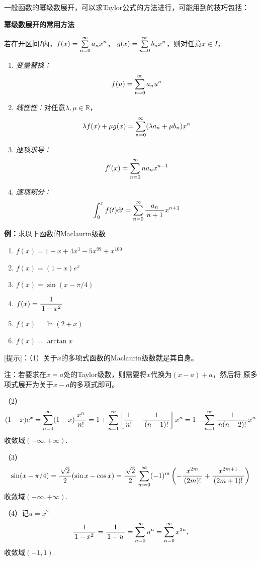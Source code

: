 一般函数的幂级数展开，可以求Taylor公式的方法进行，可能用到的技巧包括：

\begin{thx}
	{\bf 幂级数展开的常用方法}
	
	若在开区间$I$内，$f(x)=\sumn[0]a_nx^n$，
	$g(x)=\sumn[0]b_nx^n$，则对任意$x\in I$，
	\begin{enumerate}[(1)]
	  \item {\it 变量替换：}
	  $$f(u)=\sumn[0]a_nu^n$$
	  \item {\it 线性性：}对任意$\lambda,\mu\in\mathbb{R}$，
	  $$\lambda f(x)+\mu g(x)=\sumn[0](\lambda a_n+\mu
	  b_n)x^n$$ 
	  \item {\it 逐项求导：}
	  $$f'(x)=\sumn[0]na_{n}x^{n-1}$$ 
	  \item {\it 逐项积分：} 
	  $$\dint_0^x f(t)\d t=\sum\limits_{n=0}^{\infty}
	  \df{a_{n}}{n+1}x^{n+1}$$
	\end{enumerate}
\end{thx}

{\bf 例：}求以下函数的Maclaurin级数

\begin{enumerate}[(1)]
  \setlength{\itemindent}{1cm}
  \item $f(x)=1+x+4x^3-5x^{99}+x^{100}$
  \item $f(x)=(1-x)e^x$
  \item $f(x)=\sin(x-\pi/4)$
  \item $f(x)=\df 1{1-x^2}$
  \item $f(x)=\ln(2+x)$
  \item $f(x)=\arctan x$
\end{enumerate}

[提示]：（1）关于$x$的多项式函数的Maclaurin级数就是其自身。

注：若要求在$x=a$处的Taylor级数，则需要将$x$代换为$(x-a)+a$，然后将
原多项式展开为关于$x-a$的多项式即可。

（2）
$$(1-x)e^x=\sum\limits_{n=0}^{\infty}(1-x)\df{x^n}{n!}
=1+\sum\limits_{n=1}^{\infty}\left[\df1{n!}-\df1{(n-1)!}\right]x^n
=1-\sum\limits_{n=1}^{\infty}\df1{n(n-2)!}x^n$$
收敛域$(-\infty,+\infty)$.

（3）
$$\sin(x-\pi/4)=\df{\sqrt2}2(\sin x-\cos x)
=\df{\sqrt2}2\sum\limits_{m=0}^{\infty}(-1)^m
\left(-\df{x^{2m}}{(2m)!}+\df{x^{2m+1}}{(2m+1)!}\right)$$
收敛域$(-\infty,+\infty)$.

（4）记$u=x^2$
$$\df 1{1-x^2}=\df1{1-u}=\sum\limits_{n=0}^{\infty}u^n
=\sum\limits_{n=0}^{\infty}x^{2n},$$
收敛域$(-1,1)$.


